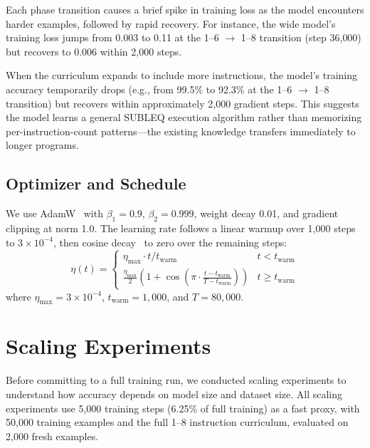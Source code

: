\documentclass[11pt,a4paper]{article}
\begin{document}
Each phase transition causes a brief spike in training loss as the model encounters harder examples, followed by rapid recovery.
For instance, the wide model's training loss jumps from 0.003 to 0.11 at the 1--6 $\to$ 1--8 transition (step 36{,}000) but recovers to 0.006 within 2{,}000 steps.

\begin{observation}
When the curriculum expands to include more instructions, the model's training accuracy temporarily drops (e.g., from 99.5\% to 92.3\% at the 1--6 $\to$ 1--8 transition) but recovers within approximately 2{,}000 gradient steps.
This suggests the model learns a general SUBLEQ execution algorithm rather than memorizing per-instruction-count patterns---the existing knowledge transfers immediately to longer programs.
\end{observation}

\subsection{Optimizer and Schedule}

We use AdamW~\cite{loshchilov2019adamw} with $\beta_1 = 0.9$, $\beta_2 = 0.999$, weight decay 0.01, and gradient clipping at norm 1.0.
The learning rate follows a linear warmup over 1{,}000 steps to $3 \times 10^{-4}$, then cosine decay~\cite{loshchilov2017sgdr} to zero over the remaining steps:
\begin{equation}
  \eta(t) =
  \begin{cases}
    \eta_{\max} \cdot t / t_{\text{warm}} & t < t_{\text{warm}} \\
    \frac{\eta_{\max}}{2}\left(1 + \cos\!\left(\pi \cdot \frac{t - t_{\text{warm}}}{T - t_{\text{warm}}}\right)\right) & t \geq t_{\text{warm}}
  \end{cases}
\end{equation}
where $\eta_{\max} = 3 \times 10^{-4}$, $t_{\text{warm}} = 1{,}000$, and $T = 80{,}000$.

\section{Scaling Experiments}
\label{sec:scaling}

Before committing to a full training run, we conducted scaling experiments to understand how accuracy depends on model size and dataset size.
All scaling experiments use 5{,}000 training steps (6.25\% of full training) as a fast proxy, with 50{,}000 training examples and the full 1--8 instruction curriculum, evaluated on 2{,}000 fresh examples.
\end{document}
